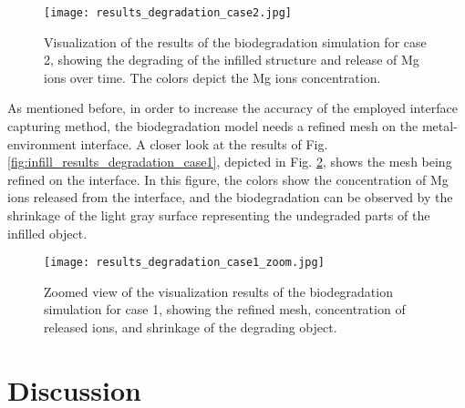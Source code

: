 \begin{figure}[h]
\centering
\medskip
\texttt{[image: results\_degradation\_case2.jpg]}
\caption[Visualization of the results of the biodegradation simulation for case 2]{Visualization of the results of the biodegradation simulation for case 2, showing the degrading of the infilled structure and release of Mg ions over time. The colors depict the Mg ions concentration.} \label{fig:infill_results_degradation_case2}
\end{figure}

As mentioned before, in order to increase the accuracy of the employed interface capturing method, the biodegradation model needs a refined mesh on the metal-environment interface. A closer look at the results of Fig. \ref{fig:infill_results_degradation_case1}, depicted in Fig. \ref{fig:infill_results_degradation_case1_zoom}, shows the mesh being refined on the interface. In this figure, the colors show the concentration of Mg ions released from the interface, and the biodegradation can be observed by the shrinkage of the light gray surface representing the undegraded parts of the infilled object.


\begin{figure}[h]
\centering
\medskip
\texttt{[image: results\_degradation\_case1\_zoom.jpg]}
\caption[Zoom view of the results of the biodegradation simulation for case 1]{Zoomed view of the visualization results of the biodegradation simulation for case 1, showing the refined mesh, concentration of released ions, and shrinkage of the degrading object.} \label{fig:infill_results_degradation_case1_zoom}
\end{figure}

\section{Discussion}


\cleardoublepage

